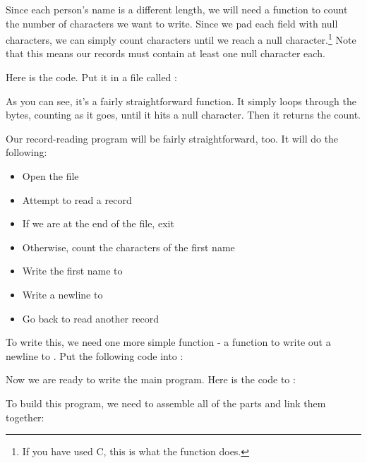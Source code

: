 Since each person's name is a different length, we will need a function
to count the number of characters we want to write.  Since we pad each
field with null characters, we can simply count characters until we 
reach a null character.\footnote{If you have used C, this is what
the  function does.}
Note that this means our records must contain at least
one null character each.  

Here is the code.  Put it in a file called :

\begin{simpletyping}

\end{simpletyping}

As you can see, it's a fairly straightforward function.  It simply 
loops through the bytes, counting as it goes, until it hits a null 
character.  Then it returns the count.

Our record-reading program will be fairly straightforward, too.  
It will do the following:

\begin{itemize}\item Open the file 
\item Attempt to read a record 
\item If we are at the end of the file, exit 
\item Otherwise, count the characters of the first name 
\item Write the first name to  
\item Write a newline to  
\item Go back to read another record 
\end{itemize}

To write this, we need one more simple function - a function to write out
a newline to .  Put the following code into 
:

\begin{simpletyping}

\end{simpletyping}

Now we are ready to write the main program.  Here is the code to
:

\begin{simpletyping}

\end{simpletyping}

To build this program, we need to assemble all of the
parts and link them together:

